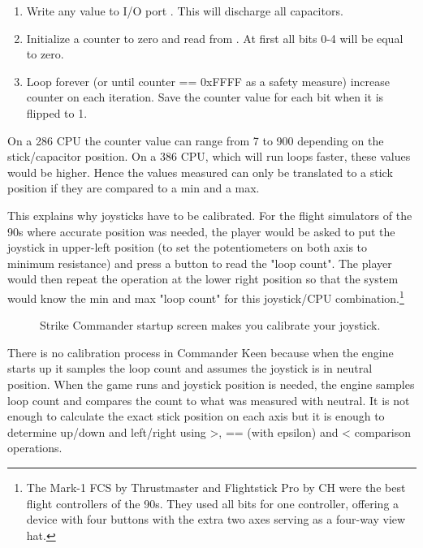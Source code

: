 \documentclass[book.tex]{subfiles}
\begin{document}
\begin{enumerate}
 \item Write  any value to I/O port . This will discharge all capacitors.
 \item Initialize a counter to zero and read  from . At first all bits 0-4 will be equal to zero.
 \item Loop forever (or until counter == 0xFFFF as a safety measure) increase counter on each iteration. Save the counter value for each bit when it is flipped to 1.
\end{enumerate}
\par
On a 286 CPU the counter value can range from 7 to 900 depending on the stick/capacitor position. On a 386 CPU, which will run loops faster, these values would be higher. Hence the values measured can only be translated to a stick position if they are compared to a min and a max.\\
\par 
This explains why joysticks have to be calibrated. For the flight simulators of the 90s where accurate position was needed, the player would be asked to put the joystick in upper-left position (to set the potentiometers on both axis to minimum resistance) and press a button to read the "loop count". The player would then repeat the operation at the lower right position so that the system  would know the min and max "loop count" for this joystick/CPU combination.\footnote{The Mark-1 FCS by Thrustmaster and Flightstick Pro by CH were the best flight controllers of the 90s. They used all bits for one controller, offering a device with four buttons with the extra two axes serving as a four-way view hat.}\\
\par
\begin{figure}[H]
\centering
{}
\caption{Strike Commander startup screen makes you calibrate your joystick.}
\end{figure}
\par
There is no calibration process in Commander Keen because when the engine starts up it samples the loop count and assumes the joystick is in neutral position. When the game runs and joystick position is needed, the engine samples loop count and compares the count to what was measured with neutral. It is not enough to calculate the exact stick position on each axis but it is enough to determine up/down and left/right using >, == (with epsilon) and < comparison operations.
\end{document}
